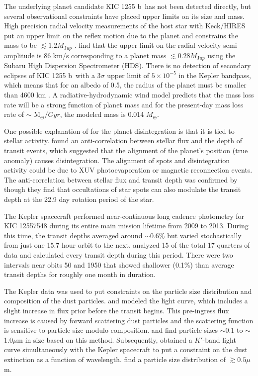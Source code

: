 \documentclass[preprint]{aastex61}
\newcommand{\sha}{KIC 1255 b}
\begin{document}
The underlying planet candidate \sha\ has not been detected directly, but several observational constraints have placed upper limits on its size and mass.
High precision radial velocity measurements of the host star with Keck/HIRES put an upper limit on the reflex motion due to the planet and constrains the mass to be $\lesssim 1.2 M_{\mathrm Jup}$ \citep{croll2014}.
\citet{masuda2018rvKIC1255} find that the upper limit on the radial velocity semi-amplitude is 86 km/s corresponding to a planet mass $\lesssim 0.28 M_{\mathrm Jup}$ using the Subaru High Dispersion Spectrometer (HDS).
There is no detection of secondary eclipses of \sha\ with a 3$\sigma$ upper limit of $5 \times 10^{-5}$ in the Kepler bandpass, which means that for an albedo of 0.5, the radius of the planet must be smaller than 4600 km \citep{vanWerkhoven2014}.
A radiative-hydrodynamic wind model predicts that the mass loss rate will be a strong function of planet mass and for the present-day mass loss rate of $\sim$ M$_\oplus/Gyr$, the modeled mass is 0.014 $M_\oplus$.

One possible explanation of for the planet disintegration is that it is tied to stellar activity.
\citet{kawahara2013starspots} found an anti-correlation between stellar flux and the depth of transit events, which suggested that the alignment of the planet's position (true anomaly) causes disintegration.
The alignment of spots and disintegration activity could be due to XUV photoevaporation or magnetic reconnection events.
The anti-correlation between stellar flux and transit depth was confirmed by \citet{croll2015starspots} though they find that occultations of star spots can also modulate the transit depth at the 22.9 day rotation period of the star.

The Kepler spacecraft performed near-continuous long cadence photometry for KIC 12557548 during its entire main mission lifetime from 2009 to 2013.
During this time, the transit depths averaged around $\sim$0.6\% but varied stochastically from just one 15.7 hour orbit to the next.
\citet{vanWerkhoven2014} analyzed 15 of the total 17 quarters of data and calculated every transit depth during this period.
There were two intervals near obits 50 and 1950 that showed shallower (0.1\%) than average transit depths for roughly one month in duration.

The Kepler data was used to put constraints on the particle size distribution and composition of the dust particles.
\citet{budaj12} and \citet{brogi2012} modeled the light curve, which includes a slight increase in flux prior before the transit begins.
This pre-ingress flux increase is caused by forward scattering dust particles and the scattering function is sensitive to particle size modulo composition.
\citet{budaj12} and \citet{brogi2012} find particle sizes $\sim$0.1 to $\sim$1.0$\mu$m in size based on this method.
Subsequently, \citet{croll2014} obtained a $K'$-band light curve simultaneously with the Kepler spacecraft to put a constraint on the dust extinction as a function of wavelength.
\citet{croll2014} find a particle size distribution of $\gtrsim 0.5\mu$m.
\end{document}
